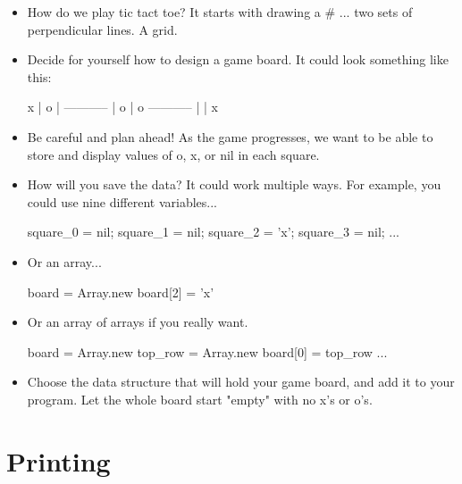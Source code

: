 \documentclass{42-en}
\begin{document}
\begin{itemize}

	\item How do we play tic tact toe? It starts with drawing a \# ... two sets of perpendicular lines. A grid.

	\item Decide for yourself how to design a game board. It could look something like this:
	\begin{42console}
	 x | o |
	-----------
	   | o | o
	-----------
	   |   | x 
	\end{42console}

	\item Be careful and plan ahead! As the game progresses, we want to be able to store and display values of o, x, or nil in each square.

	\item How will you save the data? It could work multiple ways. For example, you could use nine different variables...
	\begin{42ccode}
	square_0 = nil;
	square_1 = nil;
	square_2 = 'x';
	square_3 = nil;
	...
	\end{42ccode}

	\item Or an array...
	\begin{42ccode}
	board = Array.new
	board[2] = 'x'
	\end{42ccode}

	\item Or an array of arrays if you really want.
	\begin{42ccode}
	board = Array.new
	top_row = Array.new
	board[0] = top_row
	...
	\end{42ccode}

	\item Choose the data structure that will hold your game board, and add it to your program. Let the whole board start "empty" with no x's or o's. 

\end{itemize}

\chapter{Printing}
\end{document}
